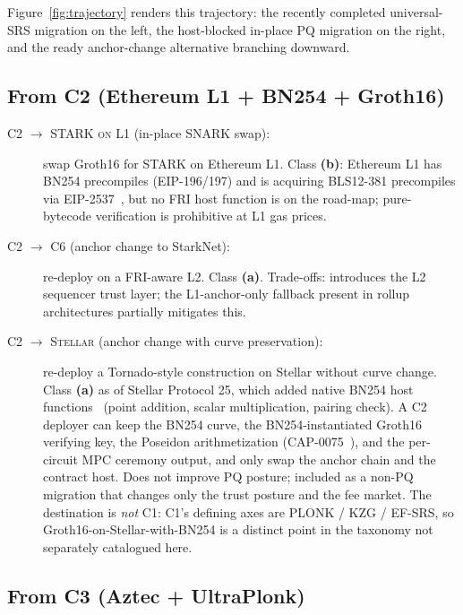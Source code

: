 Figure~\ref{fig:trajectory} renders this trajectory: the recently
completed universal-SRS migration on the left, the host-blocked
in-place PQ migration on the right, and the ready anchor-change
alternative branching downward.



\subsection{From C2 (Ethereum L1 + BN254 + Groth16)}
\label{sec:mig-c2}

\begin{description}
  \item[\textsc{C2 $\to$ STARK on L1} (in-place SNARK swap):] swap
    Groth16 for STARK on Ethereum L1. Class \textbf{(b)}:
    Ethereum L1 has BN254 precompiles (EIP-196/197) and is acquiring
    BLS12-381 precompiles via EIP-2537~\cite{eip-2537}, but no FRI
    host function is on the road-map; pure-bytecode verification is
    prohibitive at L1 gas prices.
  \item[\textsc{C2 $\to$ C6} (anchor change to StarkNet):] re-deploy
    on a FRI-aware L2. Class \textbf{(a)}. Trade-offs: introduces the
    L2 sequencer trust layer; the L1-anchor-only fallback present in
    rollup architectures partially mitigates this.
  \item[\textsc{C2 $\to$ Stellar} (anchor change with curve
    preservation):] re-deploy a Tornado-style construction on
    Stellar without curve change. Class \textbf{(a)} as of Stellar
    Protocol 25, which added native BN254 host
    functions~\cite{stellar-cap-0074} (point addition, scalar
    multiplication, pairing check). A C2 deployer can keep the
    BN254 curve, the BN254-instantiated Groth16 verifying key, the
    Poseidon arithmetization (CAP-0075~\cite{stellar-cap-0075}),
    and the per-circuit MPC ceremony output, and only swap the
    anchor chain and the contract host. Does not improve PQ
    posture; included as a non-PQ migration that changes only the
    trust posture and the fee market. The destination is
    \emph{not} C1: C1's defining axes are PLONK / KZG / EF-SRS, so
    Groth16-on-Stellar-with-BN254 is a distinct point in the
    taxonomy not separately catalogued here.
\end{description}

\subsection{From C3 (Aztec + UltraPlonk)}
\label{sec:mig-c3}

